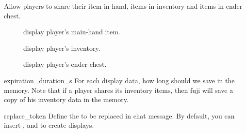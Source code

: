 Allow players to share their item in hand, items in inventory and items in ender chest.

\begin{description}
    \item [] display player's main-hand item.
    \item[] display player's inventory.
    \item[] display player's ender-chest.
\end{description}

\begin{Configuration}
    \item[expiration\_duration\_s]{
        For each display data, how long should we save in the memory.
        Note that if a player shares its inventory items, then fuji will save a copy of his inventory data in the memory.
    }

    \item[replace\_token] {
        Define the  to be replaced in chat message.
        By default, you can insert \str{[item]}, \str{[inv]} and  to create displays.
    }

\end{Configuration}